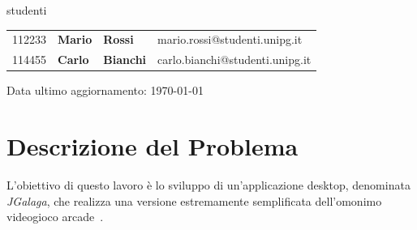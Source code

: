 \documentclass[12pt,a4paper]{report}
\begin{document}
\begin{titlepage}

	\large{studenti}\par
	\vspace{0.2cm}
	\begin{tabular}{ l l l l }
	\large{112233} & \large{\textbf{Mario}} & \large{\textbf{Rossi}} & \large{mario.rossi@studenti.unipg.it}\\
	\large{114455} & \large{\textbf{Carlo}} & \large{\textbf{Bianchi}} & \large{carlo.bianchi@studenti.unipg.it}\\
	\end{tabular}


	\vfill
	\raggedright
	\small{Data ultimo aggiornamento: \today}
\end{titlepage}
\restoregeometry

\tableofcontents

\chapter{Descrizione del Problema}\label{ch:despro}
L'obiettivo di questo lavoro è lo sviluppo di un'applicazione desktop, denominata \emph{JGalaga}, che realizza una versione estremamente semplificata dell'omonimo videogioco arcade~\cite{wiki:it:galaga,wiki:en:galaga}.
\end{document}
